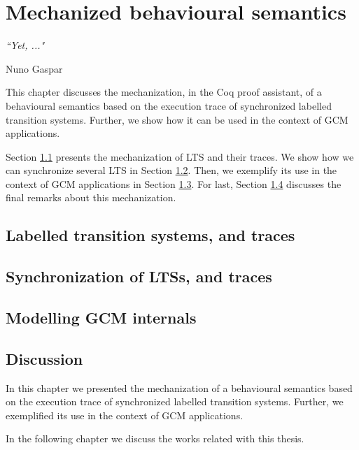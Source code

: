 
\chapter{Mechanized behavioural semantics} 
\label{chap:behaviour} 

\epigraph{\textit{“Yet, ..."}}{Nuno Gaspar}



\minitoc




	This chapter discusses the mechanization, in the Coq proof assistant, of a behavioural 
semantics based on the execution trace of synchronized labelled transition systems. Further, we show
how it can be used in the context of \ac{GCM} applications.

	Section \ref{sec:pLTS} presents the mechanization of \ac{LTS} and
their traces. We show how we can synchronize several \ac{LTS} in Section \ref{sec:pnet}.
Then, we exemplify its use in the context of \ac{GCM} applications in Section \ref{sec:gcmpnets}.
For last, Section \ref{sec:behaviourdiscussion} discusses the final remarks about this
mechanization.


\section{Labelled transition systems, and traces}
\label{sec:pLTS}





\section{Synchronization of LTSs, and traces}
\label{sec:pnet}




\section{Modelling GCM internals}
\label{sec:gcmpnets}



\section{Discussion}
\label{sec:behaviourdiscussion}


\chapbreak

	In this chapter we presented the mechanization of a behavioural 
semantics based on the execution trace of synchronized labelled transition systems. Further, we
exemplified its use in the context of \ac{GCM} applications.
	
	In the following chapter we discuss the works related with this thesis.



